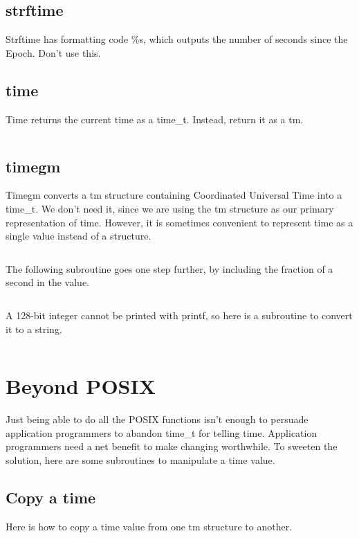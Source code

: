 \documentclass[letterpaper,twoside]{article}
\begin{document}
\subsection{strftime}
Strftime has formatting code \%s, which outputs the number of seconds
since the Epoch.  Don't use this.

\subsection{time}
Time returns the current time as a {\ttfamily time\_t}.
Instead, return it as a {\ttfamily tm}.
\inputminted[firstline=34]{c}{time_current_tm.c}

\subsection{timegm}
Timegm converts a {\ttfamily tm} structure containing Coordinated Universal Time
into a {\ttfamily time\_t}.
We don't need it, since we are using the {\ttfamily tm} structure
as our primary representation of time.  However, it is sometimes
convenient to represent time as a single value instead of a structure.
\inputminted[firstline=32]{c}{time_tm_to_integer.c}

The following subroutine goes one step further, by including the
fraction of a second in the value.
\inputminted[firstline=32]{c}{time_tm_nano_to_integer.c}

A 128-bit integer cannot be printed with printf, so here is a subroutine
to convert it to a string.
\inputminted[firstline=32]{c}{int128_to_string.c}

\section{Beyond POSIX}
Just being able to do all the POSIX functions isn't enough to persuade
application programmers to abandon {\ttfamily time\_t} for telling time.
Application programmers
need a net benefit to make changing worthwhile.  To sweeten the solution,
here are some subroutines to manipulate a time value.

\subsection{Copy a time}
\label{subsection:copy}
Here is how to copy a time value from one {\ttfamily tm} structure to another.
\inputminted[firstline=34]{c}{time_copy.c}
\end{document}

